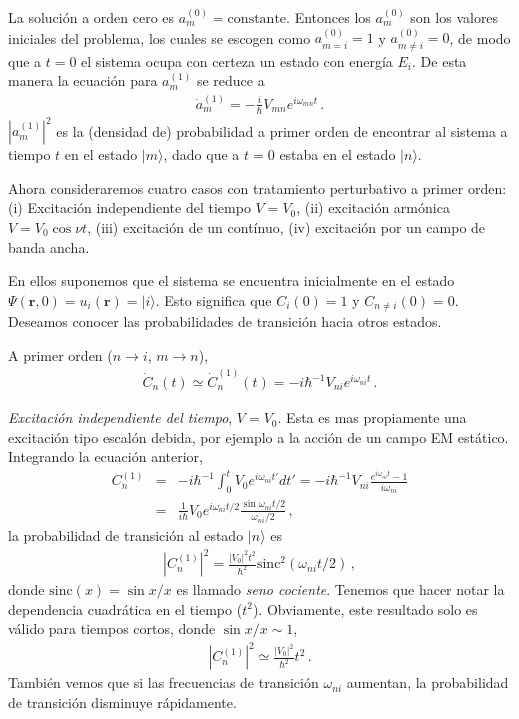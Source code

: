 \documentclass[twocolumn,aps,eqsecnum]{revtex4}
\newcommand{\mbr}{\mathbf{r}}
\providecommand{\ket}[1]{\lvert #1 \rangle}
\begin{document}
La soluci\'on a orden cero es $a_m^{(0)} = \mathrm{constante}$. Entonces 
los $a_m^{(0)}$ son los valores iniciales del problema, los cuales se 
escogen como $a_{m = i}^{(0)} =1$ y $a_{m \neq i}^{(0)} = 0$, de modo 
que a $t=0$ el sistema ocupa con certeza un estado con energ\'ia $E_i$. 
De esta manera la ecuaci\'on para $a_m^{(1)}$ se reduce a 
%
\begin{eqnarray} 
\dot{a}_m^{(1)} = - \frac{i}{\hbar} V_{mn} e^{i \omega_{mn} t} \,. 
\end{eqnarray}
$|a_m^{(1)}|^2$ es la (densidad de) probabilidad a primer orden de 
encontrar al sistema a tiempo $t$ en el estado $\ket{m}$, dado que a 
$t=0$ estaba en el estado $\ket{n}$. 

Ahora consideraremos cuatro casos con tratamiento perturbativo a primer 
orden: (i) Excitaci\'on independiente del tiempo $V = V_0$, (ii) excitaci\'on 
arm\'onica $V= V_0 \cos{\nu t}$, (iii) excitaci\'on de un cont\'inuo, 
(iv) excitaci\'on por un campo de banda ancha. 

En ellos suponemos que el sistema se encuentra inicialmente en el estado 
$\Psi (\mbr,0) = u_i (\mbr) = \ket{i}$.  Esto significa que $C_i (0) =1$ y $C_{n\neq i} (0) = 0$. Deseamos conocer las probabilidades de transici\'on 
hacia otros estados. 
 
A primer orden ($n \to i$, $m \to n$), 
%
\begin{eqnarray} 
 \dot{C}_n (t) \simeq   \dot{C}_n^{(1)} (t) 
	= -i \hbar^{-1} V_{ni} e^{i \omega_{ni} t} 	\,.
\end{eqnarray}


\vspace{3mm}
\textit{Excitaci\'on independiente del tiempo}, $V = V_0$. 
\newline Esta es mas propiamente una excitaci\'on tipo escal\'on debida, por 
ejemplo a la acci\'on de un campo EM est\'atico. Integrando la ecuaci\'on 
anterior,
%
\begin{eqnarray} 
C_n^{(1)} &=& -i \hbar^{-1} \int_0^t V_0 e^{i \omega_{ni} t'} dt' 
	= -i \hbar^{-1} V_{ni} \frac{ e^{i \omega_{ni} t} - 1 }{i \omega_{ni}} 	
	\nonumber \\ 
&=& \frac{1}{i \hbar} V_0  	e^{i \omega_{ni} t/2} 
		\frac{ \sin{\omega_{ni}t/2} }{\omega_{ni}/2} 	\,, 
\end{eqnarray}
la probabilidad de transici\'on al estado $\ket{n}$ es 
%
\begin{eqnarray} 
 |C_n^{(1)}|^2 = \frac{|V_0|^2 t^2}{\hbar^2} 
	\mathrm{sinc}^2{(\omega_{ni}t/2)} \,,
\end{eqnarray}
donde $\mathrm{sinc}(x) =\sin{x}/x$ es llamado \textit{seno cociente}.
Tenemos que hacer notar la dependencia cuadr\'atica en el tiempo 
($t^2$). Obviamente, este resultado solo es v\'alido para tiempos cortos,  
donde $\sin{x}/x \sim 1$,  
%
\begin{eqnarray} 
 |C_n^{(1)}|^2 \simeq \frac{|V_0|^2}{\hbar^2} t^2 \,.
 \end{eqnarray}
Tambi\'en vemos que si las frecuencias de transici\'on $\omega_{ni}$ 
aumentan, la probabilidad de transici\'on disminuye r\'apidamente.
 
\end{document}
